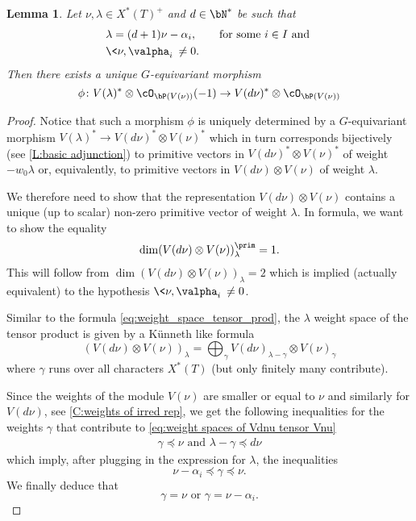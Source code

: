 \documentclass[reqno, 10pt]{amsart}
\theoremstyle{plain}
\newtheorem{lemma}[proposition]{Lemma}
\theoremstyle{definition}
\numberwithin{equation}{section}%
\begin{document}
\begin{lemma}\label{L:existence of phi}
	Let $\nu,\lambda\in X^*(T)^+$ and $d\in \bN^*$ be such that 
	\begin{align*}\label{eq:w_0lambda=rnu}
		&\lambda =(d+1)\nu-\alpha_i, \qquad \text{for some $i \in I$ and }\\
		&\<\nu,\valpha_i\>\neq 0.
	\end{align*}
	Then there exists a unique $G$-equivariant morphism
	\[ \phi\colon V(\lambda)^*\otimes\cO_{\bP(V(\nu))}(-1)\to V(d\nu)^*\otimes\cO_{\bP(V(\nu))} \]
\end{lemma}
\begin{proof}
	Notice that such a morphism $\phi$ is uniquely determined by a $G$-equivariant morphism $V(\lambda)^*\to V(d\nu)^*\otimes V(\nu)^*$ which in turn corresponds bijectively (see \cref{L:basic adjunction}) to primitive vectors in $V(d\nu)^*\otimes V(\nu)^*$ of weight $-w_0\lambda$ or, equivalently, to primitive vectors in $V(d\nu)\otimes V(\nu)$ of weight $\lambda$.
	
	We therefore need to show that the representation $V(d\nu)\otimes V(\nu)$ contains a unique (up to scalar) non-zero primitive vector of weight $\lambda$.
	In formula, we want to show the equality
	\[ \dim(V(d\nu)\otimes V(\nu))^\prim_\lambda = 1.\]
	This will follow from $\dim (V(d\nu)\otimes V(\nu))_\lambda = 2$ which is implied (actually equivalent) to the hypothesis $\<\nu,\valpha_i\>\neq 0$.

	Similar to the formula \eqref{eq:weight_space_tensor_prod}, the $\lambda$ weight space of the tensor product is given by a Künneth like formula 
	\begin{equation}\label{eq:weight spaces of Vdnu tensor Vnu}
		 (V(d\nu)\otimes V(\nu))_\lambda = \bigoplus_{\gamma}V(d\nu)_{\lambda-\gamma}\otimes V(\nu)_{\gamma}
	\end{equation}
	where $\gamma$ runs over all characters $X^*(T)$
	(but only finitely many contribute).

	Since the weights of the module $V(\nu)$ are smaller or equal to $\nu$ and similarly for $V(d\nu)$, see \cref{C:weights of irred rep}, we get the following inequalities for the weights $\gamma$ that contribute to \eqref{eq:weight spaces of Vdnu tensor Vnu}
	\begin{align*}
		\gamma\preceq\nu \text{ and }
		\lambda-\gamma\preceq d\nu
	\end{align*}
	which imply, after plugging in the expression for $\lambda$, the inequalities
	\[ \nu-\alpha_i\preceq\gamma\preceq\nu.\]
	We finally deduce that
	\[ \gamma=\nu \text{ or }\gamma = \nu-\alpha_i.\]
	

\end{proof}
\end{document}
